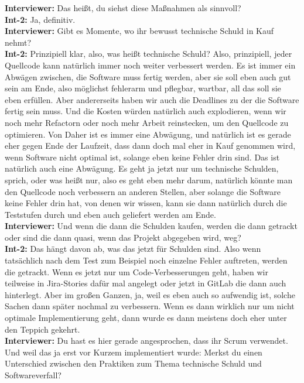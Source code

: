 \textbf{Interviewer:} Das heißt, du siehst diese Maßnahmen als sinnvoll?\\
\textbf{Int-2:} Ja, definitiv. \\
\textbf{Interviewer:} Gibt es Momente, wo ihr bewusst technische Schuld in Kauf nehmt? \\
\textbf{Int-2:} Prinzipiell klar, also, was heißt technische Schuld? Also, prinzipiell, jeder Quellcode kann natürlich immer noch weiter verbessert werden. Es ist immer ein Abwägen zwischen, die Software muss fertig werden, aber sie soll eben auch gut sein am Ende, also möglichst fehlerarm und pflegbar, wartbar, all das soll sie eben erfüllen. Aber andererseits haben wir auch die Deadlines zu der die Software fertig sein muss. Und die Kosten würden natürlich auch explodieren, wenn wir noch mehr Refactorn oder noch mehr Arbeit reinstecken, um den Quellcode zu optimieren. Von Daher ist es immer eine Abwägung, und natürlich ist es gerade eher gegen Ende der Laufzeit, dass dann doch mal eher in Kauf genommen wird, wenn Software nicht optimal ist, solange eben keine Fehler drin sind. Das ist natürlich auch eine Abwägung. Es geht ja jetzt nur um technische Schulden, sprich, oder was heißt nur, also es geht eben mehr darum, natürlich könnte man den Quellcode noch verbessern an anderen Stellen, aber solange die Software keine Fehler drin hat, von denen wir wissen, kann sie dann natürlich durch die Teststufen durch und eben auch geliefert werden am Ende. \\
\textbf{Interviewer:} Und wenn die dann die Schulden kaufen, werden die dann getrackt oder sind die dann quasi, wenn das Projekt abgegeben wird, weg? \\
\textbf{Int-2:} Das hängt davon ab, was das jetzt für Schulden sind. Also wenn tatsächlich nach dem Test zum Beispiel noch einzelne Fehler auftreten, werden die getrackt. Wenn es jetzt nur um Code-Verbesserungen geht, haben wir teilweise in Jira-Stories dafür mal angelegt oder jetzt in GitLab die dann auch hinterlegt. Aber im großen Ganzen, ja, weil es eben auch so aufwendig ist, solche Sachen dann später nochmal zu verbessern. Wenn es dann wirklich nur um nicht optimale Implementierung geht, dann wurde es dann meistens doch eher unter den Teppich gekehrt. \\
\textbf{Interviewer:} Du hast es hier gerade angesprochen, dass ihr Scrum verwendet. Und weil das ja erst vor Kurzem implementiert wurde: Merkst du einen Unterschied zwischen den Praktiken zum Thema technische Schuld und Softwareverfall?\\
